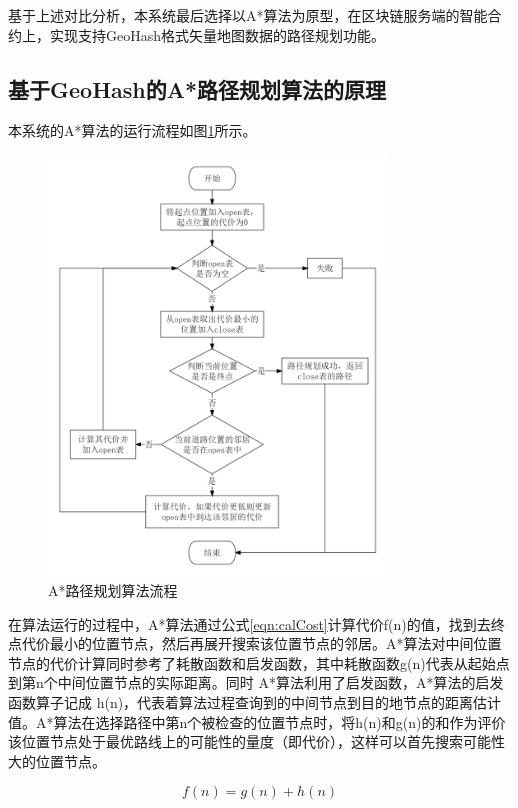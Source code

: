 基于上述对比分析，本系统最后选择以A*算法为原型，在区块链服务端的智能合约上，实现支持GeoHash格式矢量地图数据的路径规划功能。

\subsection{基于GeoHash的A*路径规划算法的原理}
本系统的A*算法的运行流程如图\ref{fig:astar}所示。

\begin{figure}[h]
  \centering
  \includegraphics[width=0.8\textwidth]{figures/astar算法流程}
  \caption{A*路径规划算法流程}\label{fig:astar}
\end{figure}

在算法运行的过程中，A*算法通过公式\ref{eqn:calCost}计算代价f(n)的值，找到去终点代价最小的位置节点，然后再展开搜索该位置节点的邻居。A*算法对中间位置节点的代价计算同时参考了耗散函数和启发函数，其中耗散函数g(n)代表从起始点到第n个中间位置节点的实际距离。同时 A*算法利用了启发函数，A*算法的启发函数算子记成 h(n)，代表着算法过程查询到的中间节点到目的地节点的距离估计值。A*算法在选择路径中第n个被检查的位置节点时，将h(n)和g(n)的和作为评价该位置节点处于最优路线上的可能性的量度（即代价），这样可以首先搜索可能性大的位置节点。

\begin{equation}
  \label{eqn:calCost}
  f(n)=g(n)+h(n)
\end{equation}

